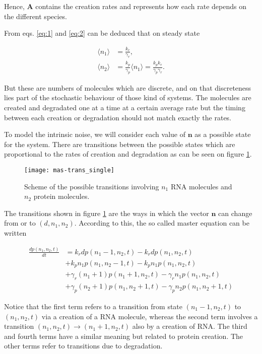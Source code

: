 Hence, $\mathbf{A}$ contains the creation rates and represents how each rate depends on the different species.

From eqs. \ref{eq:1} and \ref{eq:2} can be deduced that on steady state

\begin{align}
  \langle n_1 \rangle &= \frac{k_r}{\gamma_r}, \label{eq:ssr} \\
  \langle n_2 \rangle &= \frac{k_p}{\gamma_p} \langle n_1 \rangle = \frac{k_pk_r}{\gamma_p\gamma_r} \label{eq:ssp}.
\end{align}

But these are numbers of molecules which are discrete, and on that discreteness lies part of the stochastic behaviour of those kind of systems. The molecules are created and degradated one at a time at a certain average rate but the timing between each creation or degradation should not match exactly the rates. 

To model the intrinsic noise, we will consider each value of $\mathbf{n}$ as a possible state for the system. There are transitions between the possible states which are proportional to the rates of creation and degradation as can be seen on figure \ref{fig:mas-trans_single}.

\begin{figure}[H]
  \centering
  \texttt{[image: mas-trans\_single]}
  \caption[Transitions between states for a single gene]{\label{fig:mas-trans_single} Scheme of the possible transitions involving $n_1$ RNA molecules and $n_2$ protein molecules.}
\end{figure}

The transitions shown in figure \ref{fig:mas-trans_single} are the ways in which the vector $\mathbf{n}$ can change from or to $(d,n_1,n_2)$. According to this, the so called master equation can be written

\begin{equation}
  \label{eq:master}
  \begin{split}
    \frac{dp(n_1,n_2,t)}{dt} &= k_rdp(n_1-1,n_2,t) - k_rdp(n_1,n_2,t)\\
&+ k_pn_1p(n_1,n_2-1,t) - k_pn_1p(n_1,n_2,t)\\
&+ \gamma_r(n_1+1)p(n_1+1,n_2,t) - \gamma_rn_1p(n_1,n_2,t)\\
&+ \gamma_p(n_2+1)p(n_1,n_2+1,t) - \gamma_pn_2p(n_1,n_2+1,t)
  \end{split}
\end{equation}

Notice that the first term refers to a transition from state $(n_1-1,n_2,t)$ to $(n_1,n_2,t)$ via a creation of a RNA molecule, whereas the second term involves a transition $(n_1,n_2,t) \rightarrow (n_1+1,n_2,t)$ also by a creation of RNA. The third and fourth terms have a similar meaning but related to protein creation. The other terms refer to transitions due to degradation.

